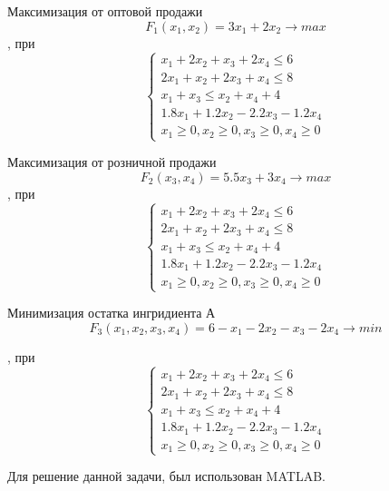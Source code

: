 \documentclass[14pt,a4paper,report]{report}
\begin{document}
Максимизация от оптовой продажи $$ F_1(x_1 , x_2) = 3x_1 + 2x_2 \rightarrow max $$
, при 
\begin{equation*}
 \begin{cases}
 x_1 + 2x_2 + x_3 + 2x_4 \leq 6 \\
  2x_1 + x_2 + 2x_3 + x_4 \leq 8 \\
  x_1+x_3 \leq x_2+x_4+4 \\
  1.8x_1 + 1.2x_2 -2.2x_3 -1.2x_4 \\
  x_1 \geq 0 ,  x_2 \geq 0 ,  x_3 \geq 0 ,  x_4 \geq 0 
 \end{cases}
\end{equation*}

 Максимизация от розничной продажи $$ F_2(x_3 , x_4) = 5.5x_3 + 3x_4 \rightarrow max $$
    , при 
\begin{equation*}
 \begin{cases}
 x_1 + 2x_2 + x_3 + 2x_4 \leq 6 \\
  2x_1 + x_2 + 2x_3 + x_4 \leq 8 \\
  x_1+x_3 \leq x_2+x_4+4 \\
  1.8x_1 + 1.2x_2 -2.2x_3 -1.2x_4 \\
  x_1 \geq 0 ,  x_2 \geq 0 ,  x_3 \geq 0 ,  x_4 \geq 0 
 \end{cases}
\end{equation*}

     Минимизация остатка ингридиента А $$ F_3(x_1, x_2, x_3 , x_4) = 6 - x_1 - 2x_2 - x_3 - 2x_4  \rightarrow min $$

, при 
\begin{equation*}
 \begin{cases}
 x_1 + 2x_2 + x_3 + 2x_4 \leq 6 \\
  2x_1 + x_2 + 2x_3 + x_4 \leq 8 \\
  x_1+x_3 \leq x_2+x_4+4 \\
  1.8x_1 + 1.2x_2 -2.2x_3 -1.2x_4 \\
  x_1 \geq 0 ,  x_2 \geq 0 ,  x_3 \geq 0 ,  x_4 \geq 0 
 \end{cases}
\end{equation*}




Для решение данной задачи, был использован MATLAB.




\end{document}
